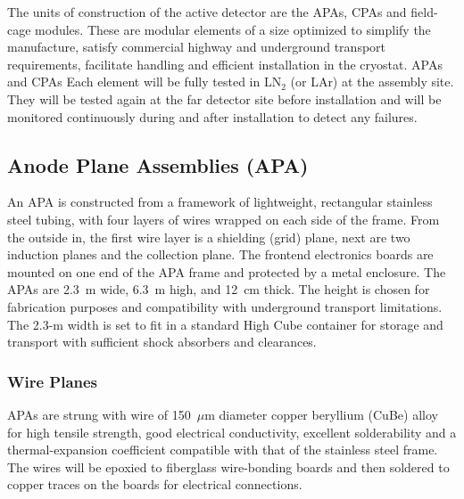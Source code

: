 The units of construction of the active detector are the APAs, CPAs
and field-cage modules. These are modular elements of a size optimized
to simplify the manufacture, satisfy commercial highway and
underground transport requirements, facilitate handling and efficient
installation in the cryostat.  APAs and CPAs Each element will be
fully tested in LN$_2$ (or LAr) at the assembly site. They will be
tested again at the far detector site before installation and will be
monitored continuously during and after installation to detect any
failures.

\subsection{Anode Plane Assemblies (APA)}
\label{subsec:fd-ref-apa}

An APA is constructed from a framework of lightweight, rectangular
stainless steel tubing, with four layers of wires wrapped on each side
of the frame.  From the outside in, the first wire layer is a
shielding (grid) plane, next are two induction planes and the
collection plane.  The frontend electronics boards are mounted on one
end of the APA frame and protected by a metal enclosure.  The APAs are
2.3~m wide, 6.3~m high, and 12~cm thick. The height is chosen for
fabrication purposes and compatibility with underground transport
limitations. The 2.3-m width is set to fit in a standard High Cube
container for storage and transport with sufficient shock absorbers
and clearances.


\subsubsection{Wire Planes}
\label{subsec:fd-ref-wireplanes}

APAs are strung with wire of 150~$\mu$m diameter copper beryllium
(CuBe) alloy for high tensile strength, good electrical conductivity,
excellent solderability and a thermal-expansion coefficient compatible
with that of the stainless steel frame.  The wires will be epoxied to
fiberglass wire-bonding boards and then soldered to copper traces on
the boards for electrical connections.

